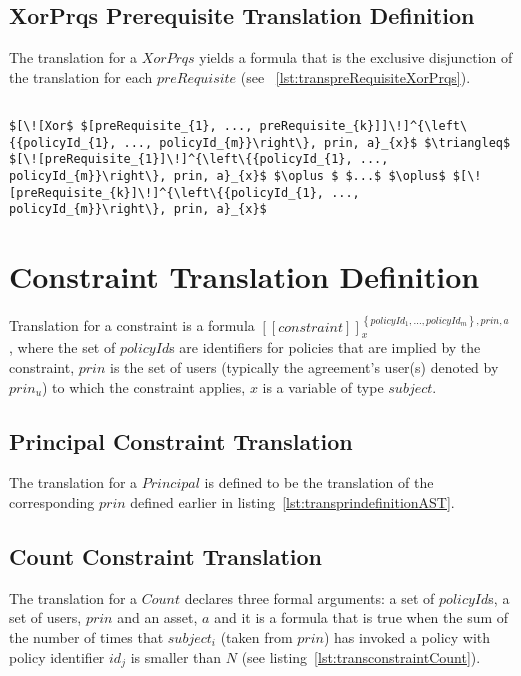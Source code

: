 \subsection{XorPrqs Prerequisite Translation Definition}
The translation for a $XorPrqs$ yields a formula that is the exclusive disjunction of the translation for each $preRequisite$ (see ~\ref{lst:transpreRequisiteXorPrqs}).

\lstset{mathescape, language=AST}  
\begin{lstlisting}[frame=single, caption={Prerequisite Translation Definition {$\colon$} Exclusive Disjunction},label={lst:transpreRequisiteXorPrqs}]

$[\![Xor$ $[preRequisite_{1}, ..., preRequisite_{k}]]\!]^{\left\{{policyId_{1}, ..., policyId_{m}}\right\}, prin, a}_{x}$ $\triangleq$ $[\![preRequisite_{1}]\!]^{\left\{{policyId_{1}, ..., policyId_{m}}\right\}, prin, a}_{x}$ $\oplus $ $...$ $\oplus$ $[\![preRequisite_{k}]\!]^{\left\{{policyId_{1}, ..., policyId_{m}}\right\}, prin, a}_{x}$

\end{lstlisting}


\section{Constraint Translation Definition}\label{sec:constraintTransDefSec}

Translation for a constraint is a formula $[\![constraint]\!]^{\left\{ {policyId_{1}, ..., policyId_{m}}\right\}, prin, a}_{x}$, where the set of $policyId$s are identifiers for policies that are implied by the constraint, $prin$ is the set of users (typically the agreement's user(s) denoted by $prin_{u}$) to which the constraint applies, $x$ is a variable of type $subject$. 

\subsection{Principal Constraint Translation}
The translation for a $Principal$ is defined to be the translation of the corresponding $prin$ defined earlier in listing~\ref{lst:transprindefinitionAST}.   


\subsection{Count Constraint Translation}
The translation for a $Count$ declares three formal arguments: a set of $policyId$s, a set of users, $prin$ and an asset, $a$ and it is a formula that is true when the sum of the number of times that $subject_{i}$ (taken from $prin$) has invoked a policy with policy identifier $id_{j}$ is smaller than $N$ (see listing~\ref{lst:transconstraintCount}). 

